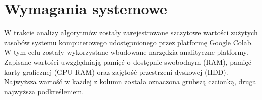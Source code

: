 \section{Wymagania systemowe}
W trakcie analizy algorytmów zostały zarejestrowane szczytowe wartości zużytych zasobów systemu komputerowego udostępnionego przez platformę Google Colab. W tym celu zostały wykorzystane wbudowane narzędzia analityczne platformy. Zapisane wartości uwzględniają pamięć o dostępnie swobodnym (RAM), pamięć karty graficznej (GPU RAM) oraz zajętość przestrzeni dyskowej (HDD). Najwyższa wartość w każdej z kolumn została oznaczona grubszą czcionką, druga najwyższa podkreśleniem.

\begin{table}[H]
    \centering
    \caption{Wykorzystane przez algorytmy zasoby komputerowe.}
    \vspace{0.1cm}
    \label{tabela_wymagania}
\end{table}